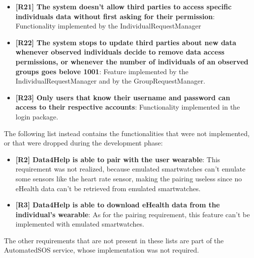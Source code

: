 \begin{itemize}
\item \textbf{[R21] The system doesn't allow third parties to access specific individuals data
without first asking for their permission}: Functionality implemented by the IndividualRequestManager

\item \textbf{[R22] The system stops to update third parties about new data whenever observed individuals decide to remove data access permissions, or whenever the
number of individuals of an observed groups goes belove 1001}: Feature implemented by the IndividualRequestManager and by the GroupRequestManager.

\item \textbf{[R23] Only users that know their username and password can access to their
respective accounts}: Functionality implemented in the login package.
\end{itemize}


The following list instead contains the functionalities that were not implemented, or that were dropped during the development phase:

\begin{itemize}
\item \textbf{[R2] Data4Help is able to pair with the user wearable}: This requirement was not realized, because emulated smartwatches can't emulate some sensors like the heart rate sensor, making the pairing useless since no eHealth data can't be retrieved from emulated smartwatches.
\item \textbf{[R3] Data4Help is able to download eHealth data from the individual's wearable}: As for the pairing requirement, this feature can't be implemented with emulated smartwatches.
\end{itemize}


The other requirements that are not present in these lists are part of the AutomatedSOS service, whose implementation was not required.